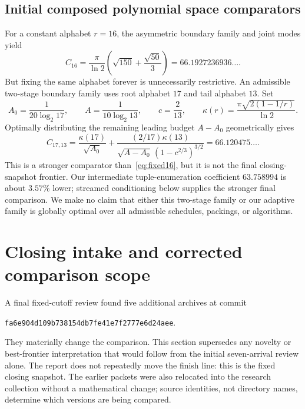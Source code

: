\documentclass[11pt,letterpaper]{article}
\theoremstyle{remark}\newtheorem{remark}[theorem]{Remark}
\begin{document}
\subsection{Initial composed polynomial space comparators}
For a constant alphabet $r=16$, the asymmetric boundary family and joint modes yield
\begin{equation}\label{eq:fixed16}
 C_{16}=\frac{\pi}{\ln2}\left(\sqrt{150}+\frac{\sqrt{50}}3\right)
       =66.1927236936\ldots.
\end{equation}
But fixing the same alphabet forever is unnecessarily restrictive. An admissible two-stage boundary family uses root alphabet $17$ and tail alphabet $13$. Set
\[
 A_0=\frac{1}{20\log_2 17},\qquad A=\frac{1}{10\log_2 13},\qquad c=\frac2{13},
 \qquad \kappa(r)=\frac{\pi\sqrt{2(1-1/r)}}{\ln2}.
\]
Optimally distributing the remaining leading budget $A-A_0$ geometrically gives
\begin{equation}\label{eq:two-stage}
 C_{17,13}=\frac{\kappa(17)}{\sqrt{A_0}}+
 \frac{(2/17)\kappa(13)}{\sqrt{A-A_0}\,(1-c^{2/3})^{3/2}}
 =66.120475\ldots.
\end{equation}
This is a stronger comparator than~\eqref{eq:fixed16}, but it is not the final closing-snapshot frontier. Our intermediate tuple-enumeration coefficient $63.758994$ is about $3.57\%$ lower; streamed conditioning below supplies the stronger final comparison. We make no claim that either this two-stage family or our adaptive family is globally optimal over all admissible schedules, packings, or algorithms.

\section{Closing intake and corrected comparison scope}
\label{sec:closing}
A final fixed-cutoff review found five additional archives at commit
\begin{center}\small\texttt{fa6e904d109b738154db7fe41e7f2777e6d24aee}.\end{center}
They materially change the comparison. This section supersedes any novelty
or best-frontier interpretation that would follow from the initial seven-arrival
review alone. The report does not repeatedly move the finish line: this is the
fixed closing snapshot. The earlier packets were also relocated into the research
collection without a mathematical change; source identities, not directory names,
determine which versions are being compared.
\end{document}
